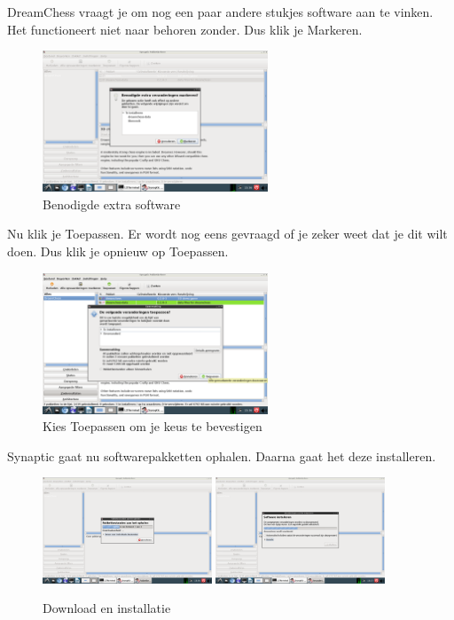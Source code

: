 \documentclass[12pt,a4paper]{article}
\begin{document}
\clearpage

DreamChess vraagt je om nog een paar andere stukjes software aan te vinken. Het functioneert niet naar behoren zonder. Dus klik je Markeren.

\begin{figure} [H]
\centering
\includegraphics[width=0.6\textwidth]{plaatje08}
\caption{Benodigde extra software}
\label{plaatje08}
\end{figure}

Nu klik je Toepassen. Er wordt nog eens gevraagd of je zeker weet dat je dit wilt doen. Dus klik je opnieuw op Toepassen. 

\begin{figure} [H]
\centering
\includegraphics[width=0.6\textwidth]{plaatje10}
\caption{Kies Toepassen om je keus te bevestigen}
\label{plaatje10}
\end{figure}

Synaptic gaat nu softwarepakketten ophalen. Daarna gaat het deze installeren.

\begin{figure} [H]
\centering
\includegraphics[width=0.45\textwidth]{plaatje11}
\includegraphics[width=0.45\textwidth]{plaatje12}
\caption{Download en installatie}
\label{plaatje11}
\end{figure}
\end{document}

